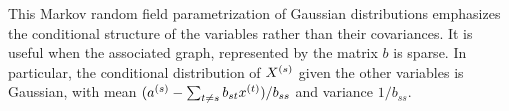 This Markov random field parametrization of Gaussian distributions emphasizes the conditional  structure of the variables rather than their covariances. It is useful when the associated graph, represented by the matrix $b$ is sparse. In particular, the conditional distribution of $X^{(s)}$ given the other variables is Gaussian, with mean $(a^{(s)} - \sum_{t\neq s} b_{st} x^{(t)})/b_{ss}$ and variance $1/b_{ss}$.













%
%
%
%
% 
%
%
%
%





